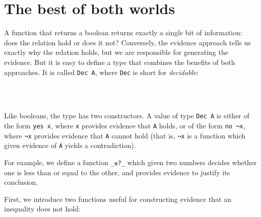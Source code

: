 \hypertarget{the-best-of-both-worlds}{%
\section{The best of both worlds}\label{the-best-of-both-worlds}}

A function that returns a boolean returns exactly a single bit of
information: does the relation hold or does it not? Conversely, the
evidence approach tells us exactly why the relation holds, but we are
responsible for generating the evidence. But it is easy to define a type
that combines the benefits of both approaches. It is called
\texttt{Dec\ A}, where \texttt{Dec} is short for \emph{decidable}:

\begin{fence}
\begin{code}%
\>[0]\AgdaSpace{}%
\AgdaSpace{}%
\AgdaSymbol{(}\AgdaSpace{}%
\AgdaSymbol{:}\AgdaSpace{}%
\AgdaSymbol{)}\AgdaSpace{}%
\AgdaSymbol{:}\AgdaSpace{}%
\AgdaSpace{}%
\<%
\\
\>[0][@{}l@{\AgdaIndent{0}}]%
\>[2]\AgdaSpace{}%
\AgdaSymbol{:}%
\>[10]\AgdaSpace{}%
\AgdaSpace{}%
\AgdaSpace{}%
\<%
\\
%
\>[2]%
\>[6]\AgdaSymbol{:}\AgdaSpace{}%
\AgdaSpace{}%
\AgdaSpace{}%
\AgdaSpace{}%
\AgdaSpace{}%
\<%
\end{code}
\end{fence}

Like booleans, the type has two constructors. A value of type
\texttt{Dec\ A} is either of the form \texttt{yes\ x}, where \texttt{x}
provides evidence that \texttt{A} holds, or of the form \texttt{no\ ¬x},
where \texttt{¬x} provides evidence that \texttt{A} cannot hold (that
is, \texttt{¬x} is a function which given evidence of \texttt{A} yields
a contradiction).

For example, we define a function \texttt{\_≤?\_} which given two
numbers decides whether one is less than or equal to the other, and
provides evidence to justify its conclusion.

First, we introduce two functions useful for constructing evidence that
an inequality does not hold:

